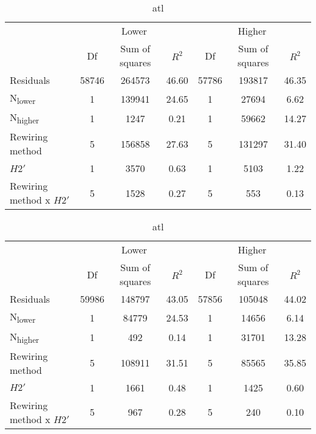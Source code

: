 \documentclass[12pt,a4paper]{article}
\begin{document}

\begin{table}
\ContinuedFloat
    \begin{subtable}{\linewidth}
    \caption{atL}
    \centering
\begin{tabularx}{\linewidth}{@{} X *6{c} @{}}
\toprule
  & \multicolumn{3}{c}{Lower} & \multicolumn{3}{c}{Higher} \\ \cmidrule(l){2-4} \cmidrule(l){5-7}
  						& Df		& Sum of squares	& $R^2$	& Df 	& Sum of squares	& $R^2$ \\ \midrule
Residuals 				& 58746 & 264573		& 46.60	& 57786 & 193817 		& 46.35   \\
N\textsubscript{lower} 	& 1 		& 139941 		& 24.65 	& 1		& 27694 		& 6.62  \\
N\textsubscript{higher} 	& 1 		& 1247 			& 0.21	& 1 		& 59662			& 14.27  \\
Rewiring method 			& 5 		& 156858			& 27.63 	& 5 		& 131297			& 31.40  \\
$H2'$ 					& 1 		& 3570 			& 0.63 	& 1 		& 5103			& 1.22 \\
Rewiring method x $H2'$ 	& 5 		& 1528 			& 0.27 	& 5 		& 553			& 0.13  \\ \bottomrule
\end{tabularx}
\end{subtable}

\medskip
    \begin{subtable}{\linewidth}
    \caption{atl}
    \centering
\begin{tabularx}{\linewidth}{@{} X *6{c} @{}}
\toprule
  & \multicolumn{3}{c}{Lower} & \multicolumn{3}{c}{Higher} \\ \cmidrule(l){2-4} \cmidrule(l){5-7}
  						& Df		& Sum of squares	& $R^2$	& Df 	& Sum of squares	& $R^2$ \\ \midrule
Residuals 				& 59986 & 148797			& 43.05	& 57856 & 105048		& 44.02   \\
N\textsubscript{lower} 	& 1 		& 84779 			& 24.53 	& 1		& 14656			& 6.14  \\
N\textsubscript{higher} 	& 1 		& 492 			& 0.14	& 1 		& 31701 		& 13.28  \\
Rewiring method 			& 5 		& 108911 		& 31.51 	& 5 		& 85565			& 35.85  \\
$H2'$ 					& 1 		& 1661 			& 0.48 	& 1 		& 1425			& 0.60 \\
Rewiring method x $H2'$ 	& 5 		& 967 			& 0.28 	& 5 		& 240			&  0.10  \\ \bottomrule
\end{tabularx}
\end{subtable}


\end{table}
\end{document}
